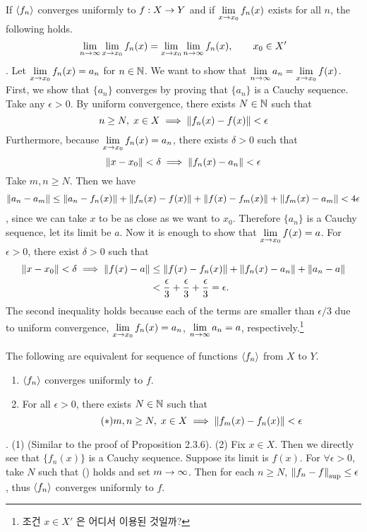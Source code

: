  If \(\left\langle f_n \right\rangle\) converges uniformly to \(f: X\rightarrow Y\) and if \(\displaystyle \lim_{x \rightarrow x_0} f_n(x)\) exists for all \(n\), the following holds.
\[
	\lim_{n\rightarrow \infty} \lim_{x \rightarrow x_0} f_n(x) = \lim_{x \rightarrow x_0} \lim_{n \rightarrow \infty} f_n(x), \qquad x_0 \in X'
\]
\pf. Let \(\displaystyle \lim_{x \rightarrow x_0} f_n(x) = a_n\) for \(n\in \mathbb{N}\). We want to show that \(\displaystyle \lim_{n\rightarrow\infty} a_n = \lim_{x\rightarrow x_0} f(x)\).
\newline
First, we show that \(\{a_n\}\) converges by proving that \(\{a_n\}\) is a Cauchy sequence.
\newline
Take any \(\epsilon > 0\). By uniform convergence, there exists \(N\in \mathbb{N}\) such that
\[
	n\geq N, \; x \in X \implies \left\lVert f_n(x) - f(x)\right\rVert < \epsilon
\]
Furthermore, because \(\displaystyle \lim_{x\rightarrow x_0} f_n(x) = a_n\), there exists \(\delta > 0\) such that
\[
	\left\lVert x - x_0\right\rVert < \delta \implies \left\lVert f_n(x) - a_n\right\rVert < \epsilon
\]
Take \(m, n \geq N\). Then we have
\[
	\begin{aligned}
		\left\lVert a_n - a_m\right\rVert \leq \left\lVert a_n - f_n(x)\right\rVert + \left\lVert f_n(x) - f(x)\right\rVert + \left\lVert f(x) - f_m(x)\right\rVert + \left\lVert f_m(x)-a_m\right\rVert < 4\epsilon
	\end{aligned}
\]
, since we can take \(x\) to be as close as we want to \(x_0\). Therefore \(\{a_n\}\) is a Cauchy sequence, let its limit be \(a\).
\newline
Now it is enough to show that \(\displaystyle \lim_{x\rightarrow x_0} f(x) = a\). For \(\epsilon > 0\), there exist \(\delta > 0\) such that
\[
	\begin{aligned}
		\left\lVert x - x_0\right\rVert < \delta \implies
		\left\lVert f(x) - a\right\rVert & \leq \left\lVert f(x) - f_n(x)\right\rVert + \left\lVert f_n(x) - a_n\right\rVert + \left\lVert a_n - a\right\rVert           \\
		                & < \frac{\epsilon}{3} + \frac{\epsilon}{3} + \frac{\epsilon}{3} = \epsilon.
	\end{aligned}
\]
The second inequality holds because each of the terms are smaller than \(\epsilon / 3\) due to uniform convergence, \(\displaystyle \lim_{x \rightarrow x_0} f_n(x) = a_n\), \(\displaystyle \lim_{n \rightarrow \infty} a_n = a\), respectively.\footnote{조건 \(x \in X'\) 은 어디서 이용된 것일까?}

 The following are equivalent for sequence of functions \(\left\langle f_n \right\rangle\) from \(X\) to \(Y\).
\begin{enumerate}
	\item \(\left\langle f_n \right\rangle\) converges uniformly to \(f\).
	\item For all \(\epsilon > 0\), there exists \(N \in \mathbb{N}\) such that
	      \begin{equation}\tag{\textasteriskcentered}
			m, n \geq N, \; x\in X \implies \left\lVert f_m(x) - f_n(x)\right\rVert < \epsilon 
		  \end{equation}
\end{enumerate}

\pf. (1) (Similar to the proof of Proposition 2.3.6).
\newline
(2) Fix \(x\in X\). Then we directly see that \(\{f_n(x)\}\) is a Cauchy sequence. Suppose its limit is \(f(x)\). For \(\forall \epsilon > 0\), take \(N\) such that (\textasteriskcentered) holds and set \(m\rightarrow \infty\). Then for each \(n \geq N\), \(\left\lVert f_n-f\right\rVert_{\sup} \leq \epsilon\), thus \(\left\langle f_n \right\rangle\) converges uniformly to \(f\).

